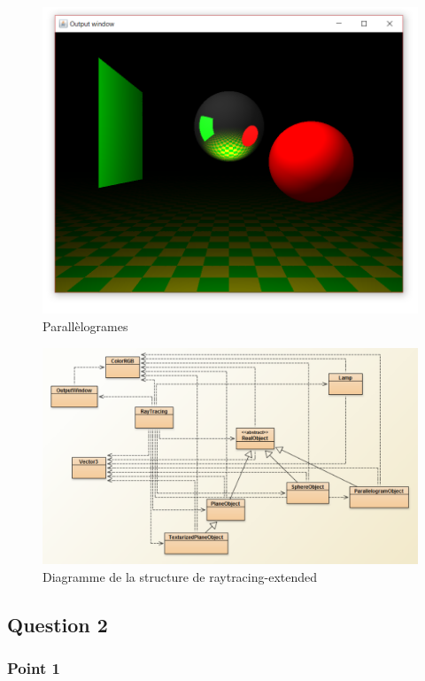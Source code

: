 \begin{figure}[H]
	\caption{\label{10_5} Parallèlogrames}
	\centering
	\includegraphics[scale = 0.4]{Figures/10_5.png}
\end{figure}

\begin{figure}[H]
	\caption{\label{10_structure} Diagramme de la structure de raytracing-extended}
	\centering
	\includegraphics[scale = 0.4]{Figures/10_structure.png}
\end{figure}

\subsection{Question 2}

\subsubsection{Point 1}

